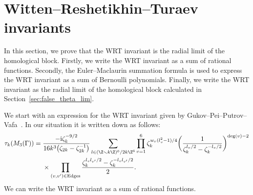 \section{Witten--Reshetikhin--Turaev invariants} \label{sec:WRT}

In this section, we prove that the WRT invariant is the radial limit of the homological block.
Firstly, we write the WRT invariant as a sum of rational functions.
Secondly, the Euler--Maclaurin summation formula is used to express the WRT invariant as a sum of Bernoulli polynomials.
Finally, we write the WRT invariant as the radial limit of the homological block calculated in Section~\ref{sec:false_theta_lim}.

We start with an expression for the WRT invariant given by Gukov--Pei--Putrov--Vafa~\cite[formula~(A.10)]{GPPV}.
In our situation it is written down as follows:
\begin{align}
		\tau_{k}(M_{3}(\Gamma))
		={}
		&\frac{-{\rm i} \zeta_{k}^{-9/2}}{16k^{3} \big(\zeta_{2k}-\zeta_{2k}^{-1}\big)}
		\sum_{l \in (\Z \smallsetminus k\Z)^{6} / 2k\Z^{6}}
		\prod_{v=1}^{6}\zeta_{k}^{w_{v}(l_{v}^{2} - 1) / 4}\bigg( \frac{1}{\zeta_{k}^{l_{v}/2} - \zeta_{k}^{-l_{v}/2}} \bigg)^{\deg(v)-2} \nonumber
\\
		&\times \prod_{(v, v') \in \mathrm{Edges}} \frac{\zeta_{k}^{l_{v}l_{v'}/2} - \zeta_{k}^{-l_{v}l_{v'}/2}}{2}.
\label{eq:WRT}
\end{align}
We can write the WRT invariant as a sum of rational functions.

